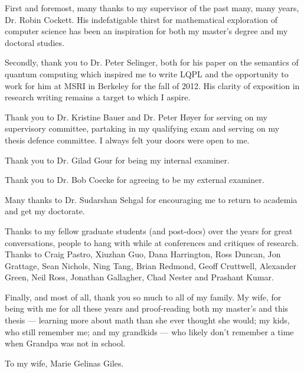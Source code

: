 \documentclass{ucalgthes1}
\begin{document}
\newpage
{}
{}

First and foremost, many thanks to my supervisor of the past many, many years, Dr. Robin
Cockett. His indefatigable thirst for mathematical exploration of computer science has been an
inspiration for both my master's degree and my doctoral studies.

Secondly, thank you to Dr. Peter Selinger, both for his paper on the semantics of quantum computing
which inspired me to write LQPL and the opportunity to work for him at MSRI in Berkeley for the fall
of 2012. His clarity of exposition in research writing remains a target to which I aspire.

Thank you to Dr. Kristine Bauer and Dr. Peter Høyer for serving on my supervisory committee,
partaking in my qualifying exam and serving on my thesis defence committee. I always felt your doors
were open to me.

Thank you to Dr. Gilad Gour for being my internal examiner.

Thank you to Dr. Bob Coecke for agreeing to be my external examiner.

Many thanks to Dr. Sudarshan Sehgal for encouraging me to return to academia and get my doctorate.

Thanks to my fellow graduate students (and post-docs) over the years for great conversations, people
to hang with while at conferences and critiques of research. Thanks to Craig Pastro, Xiuzhan Guo,
Dana Harrington, Ross Duncan, Jon Grattage, Sean Nichols, Ning Tang, Brian Redmond, Geoff Cruttwell,
Alexander Green, Neil Ross, Jonathan Gallagher, Chad Nester and Prashant Kumar.

Finally, and most of all, thank you so much to all of my family. My wife, for being with me for all
these years and proof-reading both my master's and this thesis --- learning more about math than she
ever thought she would; my kids, who still remember me; and my grandkids --- who likely don't
remember a time when Grandpa was not in school.
\newpage
{}
{}
\vspace{3in}
\begin{flushright}
To my wife, Marie Gelinas Giles.
\end{flushright}


\begin{singlespace}
\newpage
{}
\tableofcontents
\pagestyle{plain}
\newpage
{}
\listoftables
\pagestyle{plain}
\newpage
{}
\listoffigures
\pagestyle{plain}
\clearpage
\clearpage          %
\end{singlespace}
\newpage
{}
\end{document}

